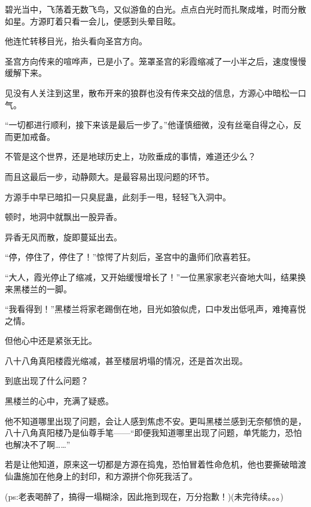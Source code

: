 \begin{this_body}
碧光当中，飞荡着无数飞鸟，又似游鱼的白光。点点白光时而扎聚成堆，时而分散如星。方源盯着只看一会儿，便感到头晕目眩。

他连忙转移目光，抬头看向圣宫方向。

圣宫方向传来的喧哗声，已是小了。笼罩圣宫的彩霞缩减了一小半之后，速度慢慢缓解下来。

见没有人关注到这里，散布开来的狼群也没有传来交战的信息，方源心中暗松一口气。

“一切都进行顺利，接下来该是最后一步了。”他谨慎细微，没有丝毫自得之心，反而更加戒备。

不管是这个世界，还是地球历史上，功败垂成的事情，难道还少么？

而且这最后一步，动静颇大。是最容易出现问题的环节。

方源手中早已暗扣一只臭屁蛊，此刻手一甩，轻轻飞入洞中。

顿时，地洞中就飘出一股异香。

异香无风而散，旋即蔓延出去。

“停，停住了，停住了！”惊愕了片刻后，圣宫中的蛊师们欣喜若狂。

“大人，霞光停止了缩减，又开始缓慢增长了！”一位黑家家老兴奋地大叫，结果换来黑楼兰的一脚。

“我看得到！”黑楼兰将家老踢倒在地，目光如狼似虎，口中发出低吼声，难掩喜悦之情。

但他心中还是紧张无比。

八十八角真阳楼霞光缩减，甚至楼层坍塌的情况，还是首次出现。

到底出现了什么问题？

黑楼兰的心中，充满了疑惑。

他不知道哪里出现了问题，会让人感到焦虑不安。更叫黑楼兰感到无奈郁愤的是，八十八角真阳楼乃是仙尊手笔——“即便我知道哪里出现了问题，单凭能力，恐怕也解决不了啊……”

若是让他知道，原来这一切都是方源在捣鬼，恐怕冒着性命危机，他也要撕破暗渡仙蛊施加在他身上的封印，和方源拼个你死我活了。

(ps:老表喝醉了，搞得一塌糊涂，因此拖到现在，万分抱歉！)(未完待续。。。)

\end{this_body}

